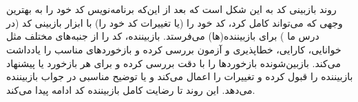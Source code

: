 \section{}
روند بازبینی کد به این شکل است که بعد از این‌که برنامه‌نویس کد خود را به بهترین وجهی که می‌تواند کامل کرد، کد خود را (یا تغییرات کد خود را)‌ با ابزار بازبینی کد (در درس ما
) برای بازبیننده(ها) می‌فرستد. بازبیننده، کد را از جنبه‌های مختلف مثل خوانایی، کارایی، خطاپذیری و آزمون بررسی کرده و بازخوردهای مناسب را یادداشت می‌کند. بازبین‌شونده بازخوردها را با دقت بررسی کرده و برای هر بازخورد یا پیشنهاد بازبیننده را قبول کرده و تغییرات را اعمال می‌کند و یا توضیح مناسبی در جواب بازبیننده می‌دهد. این روند تا رضایت کامل بازبیننده کد ادامه پیدا می‌کند.